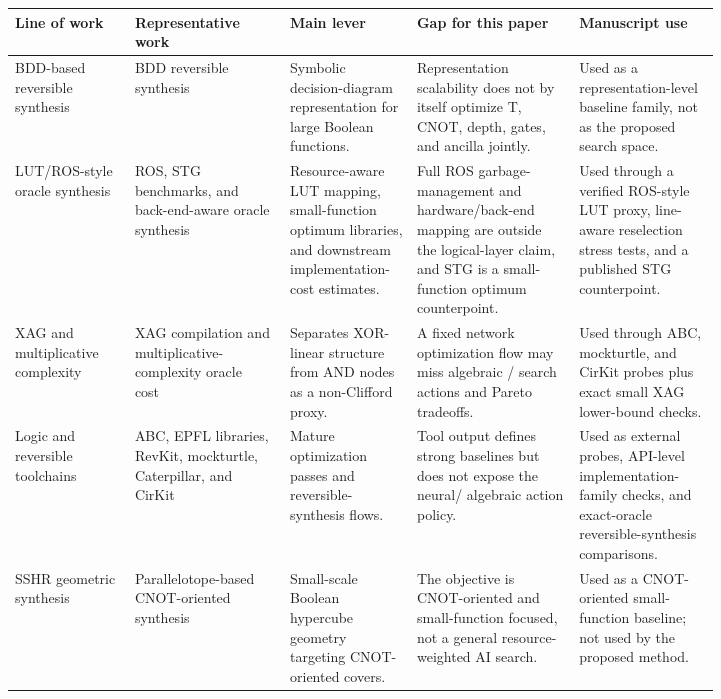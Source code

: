 \begin{tabularx}{\linewidth}{>{\raggedright\arraybackslash}p{0.17\linewidth}>{\raggedright\arraybackslash}p{0.22\linewidth}>{\raggedright\arraybackslash}X>{\raggedright\arraybackslash}p{0.23\linewidth}>{\raggedright\arraybackslash}p{0.20\linewidth}}
\toprule
Line of work & Representative work & Main lever & Gap for this paper & Manuscript use \\
\midrule
BDD-based reversible synthesis & BDD reversible synthesis~\cite{wille2009bdd} & Symbolic decision-diagram representation for large Boolean functions. & Representation scalability does not by itself optimize T, CNOT, depth, gates, and ancilla jointly. & Used as a representation-level baseline family, not as the proposed search space. \\
LUT/ROS-style oracle synthesis & ROS, STG benchmarks, and back-end-aware oracle synthesis~\cite{meuli2020ros,stgBenchmark,yu2025backend} & Resource-aware LUT mapping, small-function optimum libraries, and downstream implementation-cost estimates. & Full ROS garbage-management and hardware/back-end mapping are outside the logical-layer claim, and STG is a small-function optimum counterpoint. & Used through a verified ROS-style LUT proxy, line-aware reselection stress tests, and a published STG counterpoint. \\
XAG and multiplicative complexity & XAG compilation and multiplicative-complexity oracle cost~\cite{meuli2019multiplicative,meuli2022xag} & Separates XOR-linear structure from AND nodes as a non-Clifford proxy. & A fixed network optimization flow may miss algebraic \fprm{}/\anf{} search actions and Pareto tradeoffs. & Used through ABC, mockturtle, and CirKit probes plus exact small XAG lower-bound checks. \\
Logic and reversible toolchains & ABC, EPFL libraries, RevKit, mockturtle, Caterpillar, and CirKit~\cite{brayton2010abc,soeken2018epfl,soeken2012revkit,revkit,mockturtle,caterpillar,cirkit} & Mature optimization passes and reversible-synthesis flows. & Tool output defines strong baselines but does not expose the neural/\mcts{} algebraic action policy. & Used as external probes, API-level implementation-family checks, and exact-oracle reversible-synthesis comparisons. \\
SSHR geometric synthesis & Parallelotope-based CNOT-oriented synthesis~\cite{zheng2025sshr} & Small-scale Boolean hypercube geometry targeting CNOT-oriented covers. & The objective is CNOT-oriented and small-function focused, not a general resource-weighted AI search. & Used as a CNOT-oriented small-function baseline; not used by the proposed method. \\

\end{tabularx}
